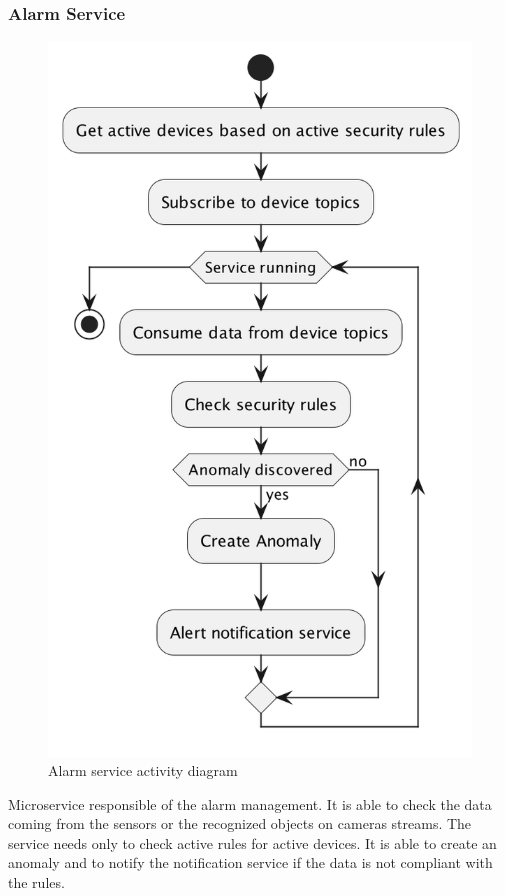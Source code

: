 \documentclass{scrartcl}
\begin{document}
    \subsubsection{Alarm Service}
    \begin{figure}
        \centering
        \includegraphics[scale=0.3]{img/alarm-activity}
        \caption{Alarm service activity diagram}
        \label{fig:alarm-activity}
    \end{figure}
    Microservice responsible of the alarm management.
    It is able to check the data coming from the sensors or the recognized objects on cameras streams.
    The service needs only to check active rules for active devices.
    It is able to create an anomaly and to notify the notification service if the data is not compliant with the rules.
\end{document}
